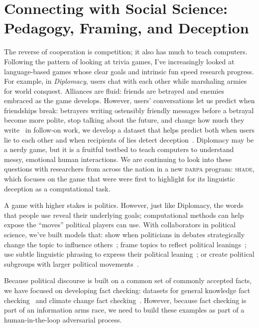 \documentclass[11pt]{amsart}
\newcommand{\abr}[1]{\textsc{#1}}
\begin{document}
\section{Connecting with Social Science: Pedagogy, Framing, and Deception}

The reverse of cooperation is competition; it also has much to teach computers.
%
Following the pattern of looking at trivia games, I've increasingly looked at language-based games whose clear goals and
intrinsic fun speed research progress.
%
For example, in \emph{Diplomacy}, users
chat with each other while marshaling armies for world conquest. Alliances are
fluid: friends are betrayed and enemies embraced as the game develops. However,
users' conversations let us predict when friendships break: betrayers writing
ostensibly friendly messages before a betrayal become more polite, stop talking
about the future, and change how much they write~\cite{niculae-15} in follow-on
work, we develop a dataset that helps predict both when users lie to each other
and when recipients of lies detect deception~\cite{Peskov-20}.
%
Diplomacy may be
a nerdy game, but it is a fruitful testbed to teach computers to understand
messy, emotional human interactions.
%
We are continuing to look into these questions with researchers from
across the nation in a new \abr{darpa} program: \abr{shade}, which focuses
on the game that were were first to highlight for its linguistic deception as a computational task.

A game with higher stakes is politics. However, just like Diplomacy, the words
that people use reveal their underlying goals; computational methods can help
expose the ``moves'' political players can use. With collaborators in political
science, we've built models that: show when politicians in debates
strategically change the topic to influence others~\cite{nguyen-12,Nguyen-14b};
frame topics to reflect political leanings~\cite{nguyen-13:shlda}; use subtle
linguistic phrasing to express their political leaning~\cite{iyyer-14a}; or
create political subgroups with larger political
movements~\cite{Nguyen:Boyd-Graber:Resnik:Miler-2015}.

Because political discourse is built on a common set of commonly
accepted facts, we have focused on developing fact checking: datasets
for general knowledge fact checking~\cite{eisenschlos-21} and climate
change fact checking~\cite{Diggelmann-20}.
%
However, because fact checking is part of an information arms race, we
need to build these examples as part of a human-in-the-loop
adversarial process.
\end{document}
